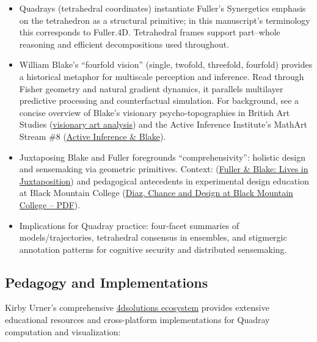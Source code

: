\documentclass[
  10pt,
]{article}
\providecommand{\tightlist}{%
  \setlength{\itemsep}{0pt}\setlength{\parskip}{0pt}}
\begin{document}
\begin{itemize}
\tightlist
\item
  Quadrays (tetrahedral coordinates) instantiate Fuller's Synergetics
  emphasis on the tetrahedron as a structural primitive; in this
  manuscript's terminology this corresponds to Fuller.4D. Tetrahedral
  frames support part--whole reasoning and efficient decompositions used
  throughout.
\item
  William Blake's ``fourfold vision'' (single, twofold, threefold,
  fourfold) provides a historical metaphor for multiscale perception and
  inference. Read through Fisher geometry and natural gradient dynamics,
  it parallels multilayer predictive processing and counterfactual
  simulation. For background, see a concise overview of Blake's
  visionary psycho‑topographies in British Art Studies
  (\href{https://www.britishartstudies.ac.uk/index/article-index/visionary-sense-of-london/article-category/cover-collaboration}{visionary
  art analysis}) and the Active Inference Institute's MathArt Stream \#8
  (\href{https://zenodo.org/records/13711302}{Active Inference \&
  Blake}).
\item
  Juxtaposing Blake and Fuller foregrounds ``comprehensivity'': holistic
  design and sensemaking via geometric primitives. Context:
  (\href{https://zenodo.org/records/7519132}{Fuller \& Blake: Lives in
  Juxtaposition}) and pedagogical antecedents in experimental design
  education at Black Mountain College
  (\href{https://commons.princeton.edu/eng574-s23/wp-content/uploads/sites/348/2023/03/Diaz-The-Experimenters-Chance-and-Design-at-Black-Mountain-College.pdf}{Diaz,
  Chance and Design at Black Mountain College -- PDF}).
\item
  Implications for Quadray practice: four‑facet summaries of
  models/trajectories, tetrahedral consensus in ensembles, and
  stigmergic annotation patterns for cognitive security and distributed
  sensemaking.
\end{itemize}

\hypertarget{pedagogy-and-implementations}{%
\subsection{Pedagogy and
Implementations}\label{pedagogy-and-implementations}}

Kirby Urner's comprehensive
\href{https://github.com/4dsolutions}{4dsolutions ecosystem} provides
extensive educational resources and cross-platform implementations for
Quadray computation and visualization:
\end{document}

